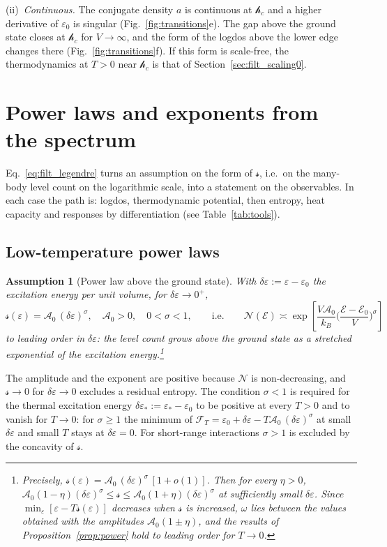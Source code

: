 \documentclass[10pt,a4paper]{article}
\theoremstyle{plain}
\newtheorem{assumption}{Assumption}
\newcommand{\cN}{\mathcal{N}}   %
\newcommand{\cA}{{\mathcal{A}_0}}   %
\newcommand{\lndos}{{logdos}}  %
\newcommand{\hfield}{\mathscr{h}}  %
\newcommand{\enrg}{\mathcal{E}}  %
\newcommand{\Fen}[1][T]{\mathscr{F}_{#1}}  %
\newcommand{\lds}{\mathscr{s}}  %
\begin{document}
(ii)~\emph{Continuous.} The conjugate density $a$ is continuous at
$\hfield_c$ and a higher derivative of $\varepsilon_0$ is singular
(Fig.~\ref{fig:transitions}e). The gap above the ground state closes at
$\hfield_c$ for $V\to\infty$, and the form of the \lndos{} above the lower
edge changes there (Fig.~\ref{fig:transitions}f). If this form is
scale-free, the thermodynamics at $T>0$ near $\hfield_c$ is that of
Section~\ref{sec:filt_scaling0}.

\section{Power laws and exponents from the spectrum}
\label{sec:filt_lowenergy}

Eq.~\eqref{eq:filt_legendre} turns an assumption on the form of
$\lds$, i.e.\ on the many-body level count on the
logarithmic scale, into a statement on the observables. In each case the
path is: \lndos, thermodynamic potential, then entropy, heat capacity and
responses by differentiation (see Table~\ref{tab:tools}).

\subsection{Low-temperature power laws}
\label{sec:filt_power_mb}

\begin{assumption}[Power law above the ground state]\label{ass:power}
With $\delta\varepsilon:=\varepsilon-\varepsilon_0$ the excitation energy per
unit volume, for $\delta\varepsilon\to0^{+}$,
\begin{equation}\label{eq:filt_stretched}
  \lds(\varepsilon)=\cA\,(\delta\varepsilon)^{\sigma} ,
  \quad \cA>0 ,\quad 0<\sigma<1 ,
  \qquad\text{i.e.}\qquad
  \cN(\enrg)\asymp\exp\left[\frac{V\cA}{k_B}\Big(\frac{\enrg-\enrg_0}{V}\Big)^{\sigma}\right]
\end{equation}
to leading order in $\delta\varepsilon$: the level count grows above the ground state
as a stretched exponential of the excitation energy.\footnote{Precisely,
$\lds(\varepsilon)=\cA\,(\delta\varepsilon)^{\sigma}\,[1+o(1)]$. Then for
every $\eta>0$,
$\cA(1-\eta)(\delta\varepsilon)^{\sigma}\le\lds\le\cA(1+\eta)(\delta\varepsilon)^{\sigma}$
at sufficiently small $\delta\varepsilon$. Since
$\min_\varepsilon[\varepsilon-T\lds(\varepsilon)]$ decreases when $\lds$ is
increased, $\omega$ lies between the values obtained with the amplitudes
$\cA(1\pm\eta)$, and the results of Proposition~\ref{prop:power} hold to
leading order for $T\to0$.}
\end{assumption}
The amplitude and the exponent are positive because $\cN$ is non-decreasing,
and $\lds\to0$ for $\delta\varepsilon\to0$ excludes a residual entropy. The
condition $\sigma<1$ is required for the thermal excitation energy
$\delta\varepsilon_*:=\varepsilon_*-\varepsilon_0$ to be positive at every
$T>0$ and to vanish for $T\to0$: for $\sigma\ge1$ the minimum of
$\Fen=\varepsilon_0+\delta\varepsilon-T\cA\,(\delta\varepsilon)^{\sigma}$ at
small $\delta\varepsilon$ and small $T$ stays at $\delta\varepsilon=0$. For
short-range interactions $\sigma>1$ is excluded by the concavity of $\lds$.
\end{document}

